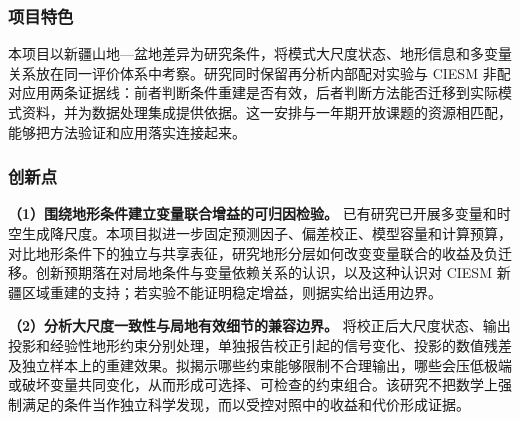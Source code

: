 \justifying
\NSFCBodyText

\subsubsection{项目特色}

本项目以新疆山地—盆地差异为研究条件，将模式大尺度状态、地形信息和多变量关系放在同一评价体系中考察。研究同时保留再分析内部配对实验与 CIESM 非配对应用两条证据线：前者判断条件重建是否有效，后者判断方法能否迁移到实际模式资料，并为数据处理集成提供依据。这一安排与一年期开放课题的资源相匹配，能够把方法验证和应用落实连接起来。

\subsubsection{创新点}

\textbf{（1）围绕地形条件建立变量联合增益的可归因检验。}
已有研究已开展多变量和时空生成降尺度。本项目拟进一步固定预测因子、偏差校正、模型容量和计算预算，对比地形条件下的独立与共享表征，研究地形分层如何改变变量联合的收益及负迁移。创新预期落在对局地条件与变量依赖关系的认识，以及这种认识对 CIESM 新疆区域重建的支持；若实验不能证明稳定增益，则据实给出适用边界。

\textbf{（2）分析大尺度一致性与局地有效细节的兼容边界。}
将校正后大尺度状态、输出投影和经验性地形约束分别处理，单独报告校正引起的信号变化、投影的数值残差及独立样本上的重建效果。拟揭示哪些约束能够限制不合理输出，哪些会压低极端或破坏变量共同变化，从而形成可选择、可检查的约束组合。该研究不把数学上强制满足的条件当作独立科学发现，而以受控对照中的收益和代价形成证据。
